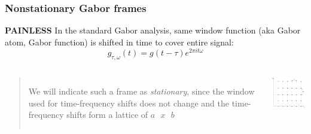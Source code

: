 \documentclass{beamer}
\begin{document}

\begin{frame}
	\frametitle{Nonstationary Gabor frames}
	\textbf{PAINLESS}
	In the standard Gabor analysis, same window function (aka Gabor atom, Gabor function) is shifted in time to cover entire signal:
	\[ g_{\tau, \omega}(t) = g(t - \tau)e^{2\pi i t \omega} \]

	\begin{columns}
		\begin{quote}
			We will indicate such a frame as \textit{stationary}, since the window used for time-frequency shifts does not change and the time-frequency shifts form a lattice of $a\text{ }x\text{ }b$
		\end{quote}
		\hspace{-2em}
	    \centering
	     \includegraphics[width=4cm]{stationarygabor.png}
        \end{columns} 
\end{frame}

\end{document}
